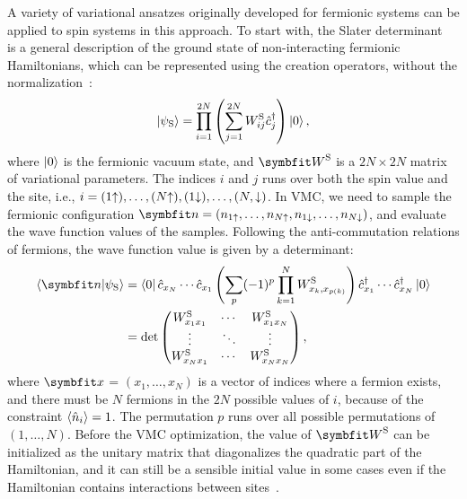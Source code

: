 A variety of variational ansatzes originally developed for fermionic systems can be applied to spin systems in this approach. To start with, the Slater determinant~\cite{slater1929theory} is a general description of the ground state of non-interacting fermionic Hamiltonians, which can be represented using the creation operators, without the normalization~\cite{toulouse2007optimization}:
\begin{equation}
\ket{\psi_\text{S}} = \prod_{i = 1}^{2 N} \left( \sum_{j = 1}^{2 N} W^\text{S}_{i j} \hat{c}^\dagger_j \right) \ket{0},
\end{equation}
where $\ket{0}$ is the fermionic vacuum state, and $\mW^\text{S}$ is a $2 N \times 2 N$ matrix of variational parameters. The indices $i$ and $j$ runs over both the spin value and the site, i.e., $i = (1 {\uparrow}), \ldots, (N {\uparrow}), (1 {\downarrow}), \ldots, (N, {\downarrow})$. In VMC, we need to sample the fermionic configuration $\vn = (n_{1 \spinup}, \ldots, n_{N \spinup}, n_{1 \spindown}, \ldots, n_{N \spindown})$, and evaluate the wave function values of the samples. Following the anti-commutation relations of fermions, the wave function value is given by a determinant:
\begin{align}
\ip{\vn}{\psi_\text{S}} &= \bra{0} \hat{c}_{x_N} \cdots \hat{c}_{x_1} \left( \sum_p (-1)^p \prod_{k = 1}^N W^\text{S}_{x_k, x_{p(k)}} \right) \hat{c}^\dagger_{x_1} \cdots \hat{c}^\dagger_{x_N} \ket{0} \\
&= \det \begin{pmatrix}
W^\text{S}_{x_1 x_1} & \cdots & W^\text{S}_{x_1 x_N} \\
\vdots & \ddots & \vdots \\
W^\text{S}_{x_N x_1} & \cdots & W^\text{S}_{x_N x_N}
\end{pmatrix},
\end{align}
where $\vx$ = $(x_1, \ldots, x_N)$ is a vector of indices where a fermion exists, and there must be $N$ fermions in the $2 N$ possible values of $i$, because of the constraint $\ev{\hat{n}_i} = 1$. The permutation $p$ runs over all possible permutations of $(1, \ldots, N)$. Before the VMC optimization, the value of $\mW^\text{S}$ can be initialized as the unitary matrix that diagonalizes the quadratic part of the Hamiltonian, and it can still be a sensible initial value in some cases even if the Hamiltonian contains interactions between sites~\cite{yokoyama1987variational, gross1987Antiferromagnetic, ferrari2022charge}.

